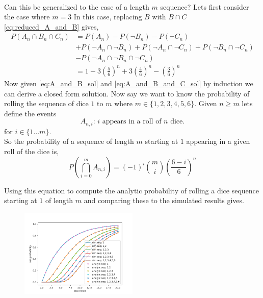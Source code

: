 \documentclass[12pt,a4paper]{article}
\begin{document}
\hrulefill\\

Can this be generalized to the case of a length $m$ sequence? Lets first consider the case where $m=3$ In this case, replacing $B$ with $B \cap C$ \cref{eq:reduced_A_and_B} gives,\\

\begin{align}
P(A_n \cap B_n \cap C_n)    &= P(A_n) - P(\neg B_n) - P(\neg C_n)\\
                            &+ P(\neg A_n \cap \neg B_n) + P(\neg A_n \cap \neg C_n) + P(\neg B_n \cap \neg C_n)\\ 
                            &- P(\neg A_n \cap \neg B_n \cap \neg C_n)\\
                            &= 1 - 3\left(\frac{5}{6}\right)^n + 3\left(\frac{4}{6}\right)^n - \left(\frac{3}{6}\right)^n
\label{eq:A_and_B_and_C_sol}
\end{align}
Now given \cref{eq:A_and_B_sol} and \cref{eq:A_and_B_and_C_sol} by induction we can derive a closed form solution. Now say we want to know the probability of rolling the sequence of dice $1$ to $m$ where $m\in\{1,2,3,4,5,6\}$. Given $n\geq m$ lets define the events
\begin{equation}
A_{n,i} \text{: $i$ appears in a roll of $n$ dice.}
\end{equation}
for $i \in \{1\ldots m\}$.\\

So the probability of a sequence of length $m$ starting at $1$ appearing in a given roll of the dice is,
\begin{equation}
P\left(\bigcap_{i=0}^m A_{n,i}\right) = (-1)^i \binom{m}{i}\left( \frac{6-i}{6} \right)^n
\end{equation}

Using this equation to compute the analytic probability of rolling a dice sequence starting at $1$ of length $m$ and comparing these to the simulated results gives.

\begin{figure}[h]
    \centering
    \includegraphics[width=0.5\textwidth]{figs/full_compare_analytic_sim.png}
    \caption{}
    \label{fig:full_compare_analytic_sim}
\end{figure}
\end{document}
